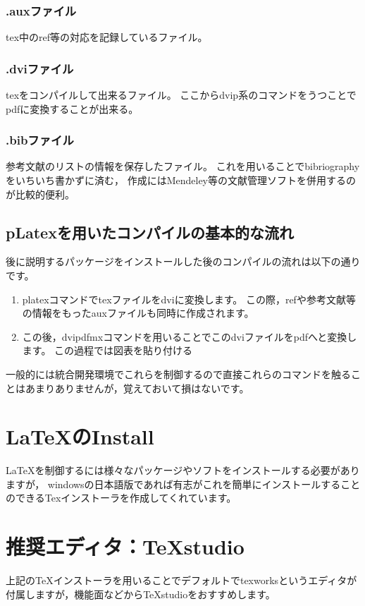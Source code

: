 \documentclass[10pt,a4paper,oneside,twocolumn,fleqn,dvipdfmx]{jsarticle}
\begin{document}
\subsubsection*{.auxファイル}
tex中のref等の対応を記録しているファイル。
\subsubsection*{.dviファイル}
texをコンパイルして出来るファイル。
ここからdvip系のコマンドをうつことでpdfに変換することが出来る。
\subsubsection*{.bibファイル}
参考文献のリストの情報を保存したファイル。
これを用いることでbibriographyをいちいち書かずに済む，
作成にはMendeley等の文献管理ソフトを併用するのが比較的便利。

\subsection{pLatexを用いたコンパイルの基本的な流れ}
後に説明するパッケージをインストールした後のコンパイルの流れは以下の通りです。
\begin{enumerate}
\item platexコマンドでtexファイルをdviに変換します。
この際，refや参考文献等の情報をもったauxファイルも同時に作成されます。

\item この後，dvipdfmxコマンドを用いることでこのdviファイルをpdfへと変換します。
この過程では図表を貼り付ける
\end{enumerate}
一般的には統合開発環境でこれらを制御するので直接これらのコマンドを触ることはあまりありませんが，覚えておいて損はないです。

\section{\LaTeX のInstall}
LaTeXを制御するには様々なパッケージやソフトをインストールする必要がありますが，
windowsの日本語版であれば有志がこれを簡単にインストールすることのできるTexインストーラを作成してくれています。

\section{推奨エディタ：TeXstudio}
上記のTeXインストーラを用いることでデフォルトでtexworksというエディタが付属しますが，機能面などからTeXstudioをおすすめします。
\end{document}
